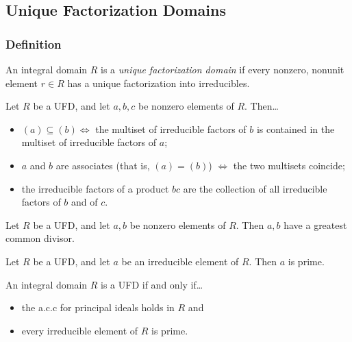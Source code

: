 \subsection{Unique Factorization Domains}\label{ufds}

\subsubsection{Definition}
An integral domain $R$ is a \emph{unique factorization domain} if every nonzero, nonunit element $r \in R$ has a unique factorization
into irreducibles.

\begin{lemma}
Let $R$ be a UFD, and let $a,b,c$ be nonzero elements of $R$. Then\dots
\begin{itemize}
  \item $(a) \subseteq (b) \Leftrightarrow$ the multiset of irreducible factors of $b$ is contained in the multiset of irreducible factors of $a$;
  \item $a$ and $b$ are associates (that is, $(a) = (b)$) $\Leftrightarrow$ the two multisets coincide;
  \item the irreducible factors of a product $bc$ are the collection of all irreducible factors of $b$ and of $c$.
\end{itemize}
\end{lemma}

\begin{lemma}
Let $R$ be a UFD, and let $a,b$ be nonzero elements of $R$. Then $a,b$ have a greatest common divisor.
\end{lemma}

\begin{lemma}
Let $R$ be a UFD, and let $a$ be an irreducible element of $R$. Then $a$ is prime.
\end{lemma}

\begin{theorem}
An integral domain $R$ is a UFD if and only if\dots
\begin{itemize}
  \item the a.c.c for principal ideals holds in $R$ and
  \item every irreducible element of $R$ is prime.
\end{itemize}
\end{theorem}